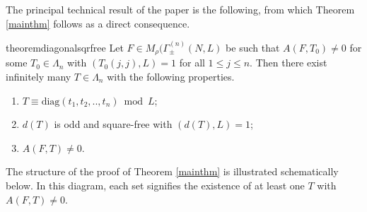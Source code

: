 \documentclass[11pt]{amsart}
\numberwithin{equation}{section}
\newcommand{\mrm}{\mathrm} %
\newcommand{\Mrho}[2]{M_\rho(\Gamma_\pm^{(#1)}(#2, L)}
\begin{document}

The principal technical result of the paper is the following, from which Theorem \ref{mainthm} follows as a direct consequence.
\begin{restatable}{theorem}{diagonalsqrfree} \label{diagonal-sqrfree}
    Let $F\in \Mrho{n}{N}$ be such that $A(F, T_0)\neq 0$ for some $T_0\in\Lambda_n$ with $(T_0(j,j), L)=1$ for all $1\le j\le n$. Then there exist infinitely many $T\in \Lambda_n$ with the following properties.
    \begin{enumerate}
        \item $T\equiv \mrm{diag}(t_1, t_2,..,t_n)\bmod L$;
        \item $d(T)$ is odd and square-free with $(d(T), L)=1$;
        \item $A(F, T)\neq 0$.
    \end{enumerate} 
\end{restatable}
The structure of the proof of Theorem \ref{mainthm} is illustrated schematically below. In this diagram, each set signifies the existence of at least one $T$ with $A(F,T) \neq 0$.
\end{document}
